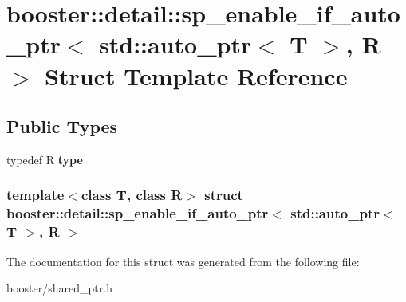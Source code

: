 \section{booster\-:\-:detail\-:\-:sp\-\_\-enable\-\_\-if\-\_\-auto\-\_\-ptr$<$ std\-:\-:auto\-\_\-ptr$<$ \-T $>$, \-R $>$ \-Struct \-Template \-Reference}
\label{structbooster_1_1detail_1_1sp__enable__if__auto__ptr_3_01std_1_1auto__ptr_3_01T_01_4_00_01R_01_4}
\subsection*{\-Public \-Types}
\begin{DoxyCompactItemize}
\item 
typedef \-R {\bfseries type}\label{structbooster_1_1detail_1_1sp__enable__if__auto__ptr_3_01std_1_1auto__ptr_3_01T_01_4_00_01R_01_4_af21be73e74cd69e96f1c901efd574552}

\end{DoxyCompactItemize}
\subsubsection*{template$<$class T, class R$>$ struct booster\-::detail\-::sp\-\_\-enable\-\_\-if\-\_\-auto\-\_\-ptr$<$ std\-::auto\-\_\-ptr$<$ T $>$, R $>$}



\-The documentation for this struct was generated from the following file\-:\begin{DoxyCompactItemize}
\item 
booster/shared\-\_\-ptr.\-h\end{DoxyCompactItemize}
